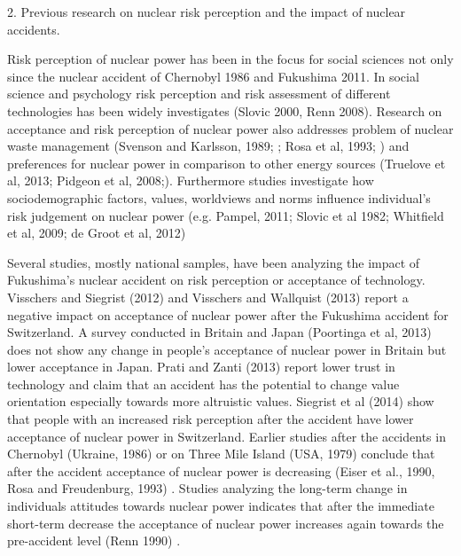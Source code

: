 
%


2. Previous research on nuclear risk perception and the impact of nuclear accidents.

Risk perception  of nuclear power has been in the focus for social sciences not only since the nuclear accident of Chernobyl 1986 and Fukushima 2011. In social science and psychology risk perception and risk assessment of different technologies has been widely investigates (Slovic 2000, Renn 2008). Research on acceptance and risk perception of nuclear power also addresses problem of nuclear waste management (Svenson and Karlsson, 1989; \citep{Svenson:1989up}; Rosa et al, 1993;  ) and preferences for nuclear power in comparison to other energy sources (Truelove et al, 2013; Pidgeon et al, 2008;). Furthermore studies investigate how sociodemographic factors, values, worldviews and norms influence individual's risk judgement on nuclear power (e.g. Pampel, 2011; Slovic et al 1982; Whitfield et al, 2009; de Groot et al, 2012)    
 
Several studies, mostly national samples, have been analyzing the impact of Fukushima's nuclear accident on risk perception or acceptance of technology. Visschers and Siegrist (2012) and Visschers and Wallquist (2013) \citep{Visschers:2012bf,Visschers:2013ee}  report a negative impact on acceptance of nuclear power after the Fukushima accident for Switzerland. A survey conducted in Britain and Japan (Poortinga et al, 2013) \citep{Poortinga:2013gt} does not show any change in people's acceptance of nuclear power in Britain but lower acceptance in Japan. Prati and Zanti (2013) \citep{Prati:2013jc} report lower trust in technology and claim that an accident has the potential to change value orientation especially towards more altruistic values.
Siegrist et al (2014) \citep{Siegrist:2014ji} show that people with an increased risk perception after the accident have lower acceptance of nuclear power in Switzerland. 
Earlier studies after the accidents in Chernobyl (Ukraine, 1986) or on Three Mile Island (USA, 1979) conclude that after the accident acceptance of nuclear power is decreasing (Eiser et al., 1990, Rosa and Freudenburg, 1993) \citep{RichardEiser:1990iw, Rosa:1993uj}. Studies analyzing the long-term change in individuals attitudes towards nuclear power indicates that after the immediate short-term decrease the acceptance of nuclear power increases again towards the pre-accident level (Renn 1990) \citep{Renn:1990kf}.  


